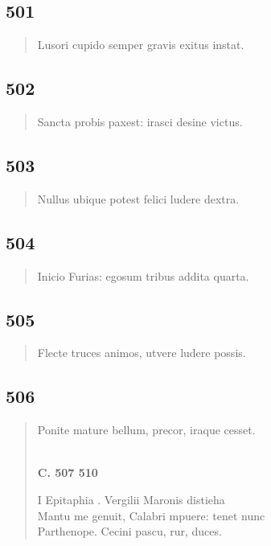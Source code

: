 \documentclass[11pt, a4paper]{report}
\begin{document}
            \subsection*{501}
      \begin{verse}
      Lusori cupido semper gravis exitus instat. \\ 
      \end{verse}
  
            \subsection*{502}
      \begin{verse}
      Sancta probis paxest: irasci desine victus. \\ 
      \end{verse}
  
            \subsection*{503}
      \begin{verse}
      Nullus ubique potest felici ludere dextra. \\ 
      \end{verse}
  
            \subsection*{504}
      \begin{verse}
      Inicio Furias: egosum tribus addita quarta. \\ 
      \end{verse}
  
            \subsection*{505}
      \begin{verse}
      Flecte truces animos, utvere ludere possis. \\ 
      \end{verse}
  
            \subsection*{506}
      \begin{verse}
      Ponite mature bellum, precor, iraque cesset. \\ 
        ﻿\pagebreak 
     \marginpar{[62]} \begin{center} \textbf{C. 507 510} \end{center}I Epitaphia . Vergilii Maronis distieha \\ Mantu me genuit, Calabri mpuere: tenet nunc \\ Parthenope. Cecini pascu, rur, duces. \\ 
      \end{verse}
  
\end{document}
